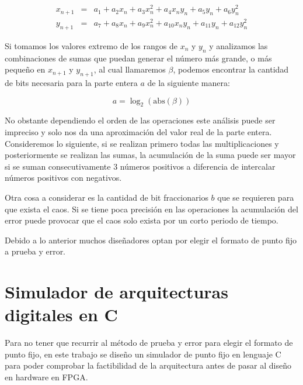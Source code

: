         \begin{equation*}
            \begin{array}{ccl}
                x_{n+1} & = &  a_{1} + a_{2}x_{n} + a_{3}x_{n}^{2} + a_{4}x_{n}y_{n} + a_{5}y_{n} + a_{6}y_{n}^{2}\\
                y_{n+1} & = &  a_{7} + a_{8}x_{n} + a_{9}x_{n}^{2} + a_{10}x_{n}y_{n} + a_{11}y_{n} + a_{12}y_{n}^{2}
            \end{array}
        \end{equation*}

        Si tomamos los valores extremo de los rangos de $x_{n}$ y $y_{n}$ y analizamos las combinaciones de sumas que puedan generar el número más grande, o más pequeño en $x_{n+1}$ y $y_{n+1}$, al cual llamaremos $\beta$, podemos encontrar la cantidad de bits necesaria para la parte entera $a$ de la siguiente manera:

        \begin{equation}
a = \log_{2} ( \text{abs}( \beta ) )
            \label{eq:}
        \end{equation}

       No obstante dependiendo el orden de las operaciones este análisis puede ser impreciso y solo nos da una aproximación del valor real de la parte entera. Consideremos lo siguiente, si se realizan primero todas las multiplicaciones y posteriormente se realizan las sumas, la acumulación de la suma puede ser mayor si se suman consecutivamente 3 números positivos a diferencia de intercalar números positivos con negativos.
       
       Otra cosa a considerar es la cantidad de bit fraccionarios $b$ que se requieren para que exista el caos. Si se tiene poca precisión en las operaciones la acumulación del error puede provocar que el caos solo exista por un corto periodo de tiempo. 

       Debido a lo anterior muchos diseñadores optan por elegir el formato de punto fijo a prueba y error. 

    \section{Simulador de arquitecturas digitales en C}

        Para no tener que recurrir al método de prueba y error para elegir el formato de punto fijo, en este trabajo se diseño un simulador de punto fijo en lenguaje C para poder comprobar la factibilidad de la arquitectura antes de pasar al diseño en hardware en FPGA. 

